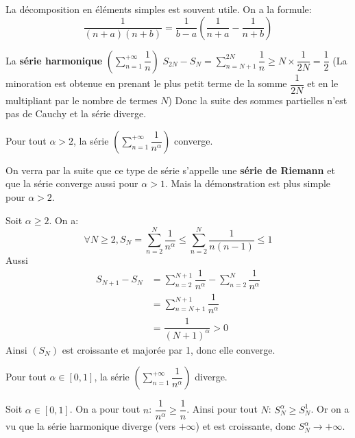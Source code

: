 \documentclass[a4paper, 12pt]{article}
\begin{document}
\begin{methode}
    La décomposition en éléments simples est souvent utile.
    On a la formule:
    $$
    \dfrac{1}{(n + a)(n + b)} = \dfrac{1}{b - a}\left(\dfrac{1}{n + a} - \dfrac{1}{n + b}\right)
    $$
\end{methode}

\begin{exemple}
    La \textbf{série harmonique} $(\sum\limits_{n=1}^{+\infty}\dfrac{1}{n})$\n
    $S_{2N} - S_N = \sum\limits_{n=N+1}^{2N}\dfrac{1}{n} \geq N \times \dfrac{1}{2N} = \dfrac{1}{2}$\n
    (La minoration est obtenue en prenant le plus petit terme de la somme $\dfrac{1}{2N}$ et en le multipliant par le nombre de termes $N$)\n
    Donc la suite des sommes partielles n'est pas de Cauchy et la série diverge.
\end{exemple}

\begin{proposition}{}{}
    Pour tout $\alpha \gt 2$, la série $(\sum\limits_{n=1}^{+\infty}\dfrac{1}{n^\alpha})$ converge.
\end{proposition}

\begin{remarque}
    On verra par la suite que ce type de série s'appelle une \textbf{série de Riemann} et que la série converge aussi pour $\alpha \gt 1$.
    Mais la démonstration est plus simple pour $\alpha \gt 2$.
\end{remarque}

\begin{demonstration}
    Soit $\alpha \geq 2$.\n
    On a:
    $$
    \forall N \geq 2, S_N = \sum\limits_{n=2}^{N}\dfrac{1}{n^\alpha} \leq \sum\limits_{n=2}^{N}\dfrac{1}{n(n-1)} \leq 1
    $$
    Aussi
    \begin{align*}
    S_{N+1} - S_N &= \sum\limits_{n=2}^{N+1}\dfrac{1}{n^\alpha} - \sum\limits_{n=2}^{N}\dfrac{1}{n^\alpha}\\
    &= \sum\limits_{n=N+1}^{N+1}\dfrac{1}{n^\alpha}\\
    &= \dfrac{1}{(N+1)^\alpha} \gt 0
    \end{align*}
    Ainsi $(S_N)$ est croissante et majorée par 1, donc elle converge.
\end{demonstration}

\begin{proposition}{}{}
    Pour tout $\alpha \in [0, 1]$, la série $(\sum\limits_{n=1}^{+\infty}\dfrac{1}{n^\alpha})$ diverge.
\end{proposition}

\begin{demonstration}
    Soit $\alpha \in [0, 1]$.\n
    On a pour tout $n$: $\dfrac{1}{n^\alpha} \geq \dfrac{1}{n}$.\n
    Ainsi pour tout $N$: $S_N^\alpha \geq S_N^1$.\n
    Or on a vu que la série harmonique diverge (vers $+\infty$) et est croissante, donc $S_N^\alpha \rightarrow +\infty$.\n
\end{demonstration}
\end{document}
